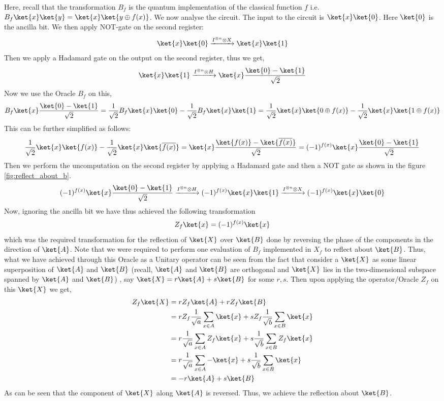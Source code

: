 \documentclass[12pt, oneside]{book}
\theoremstyle{definition}
\theoremstyle{definition}
\theoremstyle{remark}
\begin{document}
Here, recall that the transformation $B_f$ is the quantum implementation of the classical function $f$ i.e. $B_f\ket{x}\ket{y}=\ket{x}\ket{y\oplus f(x)}$.
We now analyse the circuit. The input to the circuit is $\ket{x}\ket{0}$. Here $\ket{0}$ is the ancilla bit. We then apply NOT-gate on the second register:
\[
\ket{x}\ket{0}\xrightarrow{I^{\otimes n}\otimes X}\ket{x}\ket{1}
\]
Then we apply a Hadamard gate on the output on the second register, thus we get,
\[
\ket{x}\ket{1}\xrightarrow{I^{\otimes n}\otimes H}\ket{x}\frac{\ket{0}-\ket{1}}{\sqrt{2}}
\]
Now we use the Oracle $B_f$ on this,
\[
B_f\ket{x}\frac{\ket{0}-\ket{1}}{\sqrt{2}}=\frac{1}{\sqrt{2}}B_f\ket{x}\ket{0}-\frac{1}{\sqrt{2}}B_f\ket{x}\ket{1}=\frac{1}{\sqrt{2}}\ket{x}\ket{0\oplus f(x)}-\frac{1}{\sqrt{2}}\ket{x}\ket{1\oplus f(x)}
\]
This can be further simplified as follows:
\[
\frac{1}{\sqrt{2}}\ket{x}\ket{f(x)}-\frac{1}{\sqrt{2}}\ket{x}\ket{\overline{f(x)}}=\ket{x}\frac{\ket{f(x)}-\ket{\overline{f(x)}}}{\sqrt{2}}=(-1)^{f(x)}\ket{x}\frac{\ket{0}-\ket{1}}{\sqrt{2}}
\]
Then we perform the uncomputation on the second register by applying a Hadamard gate and then a NOT gate as shown in the figure \ref{fig:reflect_about_b}.
\[
(-1)^{f(x)}\ket{x}\frac{\ket{0}-\ket{1}}{\sqrt{2}}\xrightarrow{I^{\otimes n}\otimes H}(-1)^{f(x)}\ket{x}\ket{1}\xrightarrow{I^{\otimes n}\otimes X}(-1)^{f(x)}\ket{x}\ket{0}
\]
Now, ignoring the ancilla bit we have thus achieved the following transformation
\[
Z_f\ket{x}=(-1)^{f(x)}\ket{x}
\]
which was the required transformation for the reflection of $\ket{X}$ over $\ket{B}$ done by reversing the phase of the components in the direction of $\ket{A}$. Note that we were required to perform one evaluation of $B_f$ implemented in $X_f$ to reflect about $\ket{B}$. Thus, what we have achieved through this Oracle as a Unitary operator can be seen from the fact that consider a $\ket{X}$ as some linear superposition of $\ket{A}$ and $\ket{B}$ (recall, $\ket{A}$ and $\ket{B}$ are orthogonal and $\ket{X}$ lies in the two-dimensional subspace spanned by $\ket{A}$ and $\ket{B}$) , say $\ket{X}=r\ket{A}+s\ket{B}$ for some $r,s$. Then upon applying the operator/Oracle $Z_f$ on this $\ket{X}$ we get,
\begin{align*}
Z_f\ket{X}&=r Z_f\ket{A}+r Z_f\ket{B}\\
&=r Z_f\frac{1}{\sqrt{a}}\sum_{x\in A}\ket{x}+s Z_f\frac{1}{\sqrt{b}}\sum_{x\in B}\ket{x}\\
&=r \frac{1}{\sqrt{a}}\sum_{x\in A}Z_f\ket{x}+s \frac{1}{\sqrt{b}}\sum_{x\in B}Z_f\ket{x}\\
&=r \frac{1}{\sqrt{a}}\sum_{x\in A}-\ket{x}+s \frac{1}{\sqrt{b}}\sum_{x\in B}\ket{x}\\
&=-r \ket{A}+s\ket{B}
\end{align*}
As can be seen that the component of $\ket{X}$ along $\ket{A}$ is reversed. Thus, we achieve the reflection about $\ket{B}$.
\end{document}
